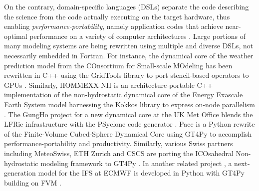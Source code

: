 \documentclass[gmd,manuscript,online]{copernicus}
\theoremstyle{theorem}
\theoremstyle{definition}
\theoremstyle{remark}
\theoremstyle{proposition}
\begin{document}
	On the contrary, domain-specific languages (DSLs) separate the code describing the science from the code actually executing on the target hardware, thus enabling \emph{performance-portability}, namely application codes that achieve near-optimal performance on a variety of computer architectures \citep{deakin19}. Large portions of many modeling systems are being rewritten using multiple and diverse DSLs, not necessarily embedded in Fortran. For instance, the dynamical core of the weather prediction model from the COnsortium for Small-scale MOdeling \citep[COSMO;][]{baldauf11} has been rewritten in C++ using the GridTools library \citep{afanasyev21} to port stencil-based operators to GPUs \citep{fuhrer14, fuhrer18}. Similarly, HOMMEXX-NH \citep{bertagna20} is an architecture-portable C++ implementation of the non-hydrostatic dynamical core of the Energy Exascale Earth System model \citep[E3SM;][]{taylor20} harnessing the Kokkos library to express on-node parallelism \citep{edwards14}. The GungHo project for a new dynamical core at the UK Met Office blends the LFRic infrastructure with the PSyclone code generator \citep{adams19}. Pace \citep{ben-nun22, dahm23} is a Python rewrite of the Finite-Volume Cubed-Sphere Dynamical Core \citep[FV3;][]{harris13} using GT4Py to accomplish performance-portability and productivity. Similarly, various Swiss partners including MeteoSwiss, ETH Zurich and CSCS are porting the ICOsahedral Non-hydrostatic modeling framework \citep[ICON;][]{zangl15} to GT4Py \citep{luz24}. In another related project \citep{kuhnlein23}, a next-generation model for the IFS at ECMWF is developed in Python with GT4Py building on FVM \citep{smolarkiewicz16, kuehnlein19}.
\end{document}
